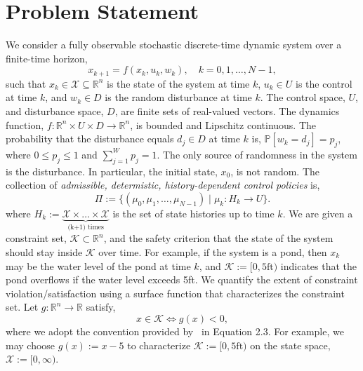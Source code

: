 \documentclass[letterpaper, 10 pt, conference]{ieeeconf}  %
\begin{document}
\section{Problem Statement}
\label{sec::problem}
We consider a fully observable stochastic discrete-time dynamic system over a finite-time horizon,\footnotemark
{}
\begin{equation}
x_{k+1} = f(x_k,u_k,w_k), \quad k = 0, 1, \dots, N-1,
\label{sys}
\end{equation}
such that $x_k \in \mathcal{X} \subseteq \mathbb{R}^n$ is the state of the system at time $k$,
$u_k \in U$ is the control at time $k$, and
$w_k \in D$ is the random disturbance at time $k$. The control space, $U$, and disturbance space, $D$, are finite sets of real-valued vectors.
The dynamics function, $f : \mathbb{R}^n \times U \times D \rightarrow \mathbb{R}^n$, is bounded and Lipschitz continuous.
The probability that the disturbance equals $d_j \in D$ at time $k$ is, $\mathbb{P}[w_k = d_j] = p_j$, 
where $0 \leq p_j \leq 1$ and $\sum_{j=1}^W p_j = 1$.\footnotemark
{}  
The only source of randomness in the system is the disturbance.
In particular, the initial state, $x_0$, is not random. 
The collection of \textit{admissible, determistic, history-dependent control policies} is,
%
\begin{equation}
\Pi := \big\{ (\mu_0, \mu_1, \dots, \mu_{N-1}) \mid \mu_k: H_k \rightarrow U \big\}.
\label{pi}
\end{equation}
%
where $H_k := \underbrace{\mathcal{X} \times \hdots \times \mathcal{X}}_{\text{(k+1) times}}$ is the set of state histories up to time $k$.
We are given a constraint set, $\mathcal{K} \subset \mathbb{R}^n$, and the safety criterion that 
the state of the system should stay inside $\mathcal{K}$ over time. 
For example, if the system is a pond, then $x_k$ may be the water level of the pond at time $k$,
and $\mathcal{K} := [0, 5\text{ft})$ indicates that the pond overflows if the water level exceeds 5ft.
We quantify the extent of constraint violation/satisfaction using a surface function that characterizes the constraint set.
Let $g: \mathbb{R}^n \rightarrow \mathbb{R}$ satisfy,
%
\begin{equation}
x \in \mathcal{K} \iff g(x) < 0,
\label{g}
\end{equation}
%
where we adopt the convention provided by~\cite{EECS-2018-41} in Equation 2.3.
For example, we may choose $g(x) := x - 5$ to characterize $\mathcal{K} := [0, 5\text{ft})$ on the state space, 
$\mathcal{X} := [0, \infty)$.
\end{document}
